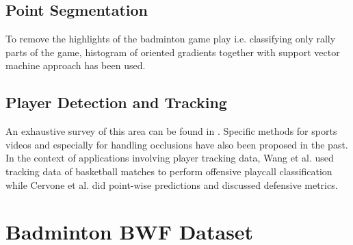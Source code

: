 \documentclass[runningheads,a4paper]{llncs}
\begin{document}
\subsection{Point Segmentation}

To remove the highlights of the badminton game play i.e. classifying only rally parts of the game, histogram of oriented gradients together with support vector machine approach \cite{ghosh2018towards} has been used.
\subsection{Player Detection and Tracking}
An exhaustive survey of this area can be found in \cite{nguyen2012human}. Specific methods for sports videos \cite{mentzelopoulos2013active, yan2014automatic} and especially for handling occlusions \cite{held2016learning} have also been proposed in the past. In the context of applications involving player tracking data, Wang et al. \cite{wang2016classifying} used tracking data of basketball matches to perform offensive playcall classification while Cervone et al. \cite{cervone2014pointwise} did point-wise predictions and discussed defensive metrics.

\section{Badminton BWF Dataset}
\end{document}
